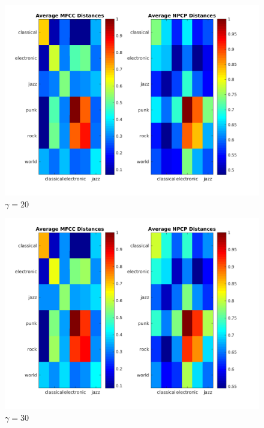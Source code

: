 \documentclass[11pt, a4paper]{article}
\begin{document}
\begin{figure}[H]
\hspace*{-2cm}    
    \centering
    \includegraphics[width=1.25\textwidth]{average20.png}
    \caption{$\gamma = 20$}
\end{figure}

\begin{figure}[H]
\hspace*{-2cm}    
    \centering
    \includegraphics[width=1.25\textwidth]{average30.png}
    \caption{$\gamma = 30$}
\end{figure}
\end{document}
